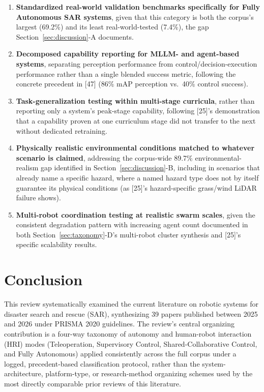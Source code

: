 \documentclass[journal]{IEEEtran}
\begin{document}
\begin{enumerate}

\item \textbf{Standardized real-world validation benchmarks specifically for Fully Autonomous SAR systems}, given that this category is both the corpus's largest (69.2\%) and its least real-world-tested (7.4\%), the gap Section~\ref{sec:discussion}-A documents.

\item \textbf{Decomposed capability reporting for MLLM- and agent-based systems}, separating perception performance from control/decision-execution performance rather than a single blended success metric, following the concrete precedent in [47] (86\% mAP perception vs.\ 40\% control success).

\item \textbf{Task-generalization testing within multi-stage curricula}, rather than reporting only a system's peak-stage capability, following [25]'s demonstration that a capability proven at one curriculum stage did not transfer to the next without dedicated retraining.

\item \textbf{Physically realistic environmental conditions matched to whatever scenario is claimed}, addressing the corpus-wide 89.7\% environmental-realism gap identified in Section~\ref{sec:discussion}-B, including in scenarios that already name a specific hazard, where a named hazard type does not by itself guarantee its physical conditions (as [25]'s hazard-specific grass/wind LiDAR failure shows).

\item \textbf{Multi-robot coordination testing at realistic swarm scales}, given the consistent degradation pattern with increasing agent count documented in both Section~\ref{sec:taxonomy}-D's multi-robot cluster synthesis and [25]'s specific scalability results.

\end{enumerate}

\section{Conclusion}
\label{sec:conclusion}
This review systematically examined the current literature on robotic systems for disaster search and rescue (SAR), synthesizing 39 papers published between 2025 and 2026 under PRISMA 2020 guidelines. The review's central organizing contribution is a four-way taxonomy of autonomy and human-robot interaction (HRI) modes (Teleoperation, Supervisory Control, Shared-Collaborative Control, and Fully Autonomous) applied consistently across the full corpus under a logged, precedent-based classification protocol, rather than the system-architecture, platform-type, or research-method organizing schemes used by the most directly comparable prior reviews of this literature.
\end{document}

